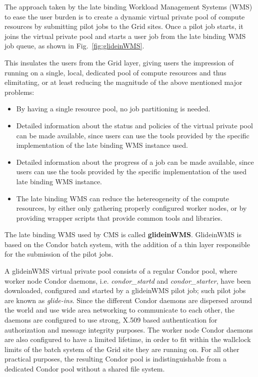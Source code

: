 \documentclass[a4paper]{jpconf}
\begin{document}
The approach taken by the late binding Workload Management Systems (WMS) to ease the user burden is 
to create a dynamic virtual private pool of compute resources by submitting pilot jobs to the Grid sites.
Once a pilot job starts, it joins the virtual private pool and starts a user job from the late binding WMS job queue, 
as shown in Fig.~\ref{fig:glideinWMS}.

This insulates the users from the Grid layer, giving users
the impression of running on a single, local, dedicated pool of compute resources
and thus elimitating, or at least reducing the magnitude of the above mentioned major problems:
\begin {itemize}
\item 
By having a single resource pool, no job partitioning is needed.
\item
Detailed information about the status and policies of the virtual private pool can be made available, 
since users can use the tools provided by the specific implementation of the late binding WMS instance used.
\item 
Detailed information about the progress of a job can be made available,
since users can use the tools provided by the specific implementation of the used late binding WMS instance.
\item
The late binding WMS can reduce the hetereogeneity of the compute resources, 
by either only gathering properly configured worker nodes,
or by providing wrapper scripts that provide common tools and libraries.
\end{itemize}

The late binding WMS used by CMS is called \textbf{glideinWMS}. GlideinWMS is based on the Condor batch system, 
with the addition of a thin layer responsible for the submission of the pilot jobs.

A glideinWMS virtual private pool consists of a regular Condor pool, 
where worker node Condor daemons, i.e. \emph{condor\_startd} and \emph{condor\_starter}, 
have been downloaded, configured and started by a glideinWMS pilot job; such pilot jobs are known as \emph{glide-ins}. 
Since the different Condor daemons are dispersed around the world and use wide area networking to communicate to each other,
the daemons are configured to use strong, X.509 based authentication for authorization and message integrity purposes.
The worker node Condor daemons are also configured to have a limited lifetime, in order to fit within the wallclock limits 
of the batch system of the Grid site they are running on.
For all other practical purposes, the resulting Condor pool is indistinguishable from a dedicated Condor pool without a shared file system.
\end{document}
